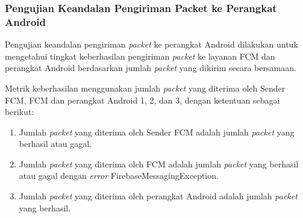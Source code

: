 \subsubsection{Pengujian Keandalan Pengiriman Packet ke Perangkat Android}
\par Pengujian keandalan pengiriman \textit{packet} ke perangkat Android dilakukan untuk mengetahui tingkat keberhasilan pengiriman \textit{packet} ke layanan FCM dan perangkat Android berdasarkan jumlah \textit{packet} yang dikirim secara bersamaan.
\par Metrik keberhasilan menggunakan jumlah \textit{packet} yang diterima oleh Sender FCM, FCM dan perangkat Android 1, 2, dan 3, dengan ketentuan sebagai berikut:
\begin{enumerate}
	\item Jumlah \textit{packet} yang diterima oleh Sender FCM adalah jumlah \textit{packet} yang berhasil atau gagal.
	\item Jumlah \textit{packet} yang diterima oleh FCM adalah jumlah \textit{packet} yang berhasil atau gagal dengan \textit{error} FirebaseMessagingException.
	\item Jumlah \textit{packet} yang diterima oleh perangkat Android adalah jumlah \textit{packet} yang berhasil.
\end{enumerate}


